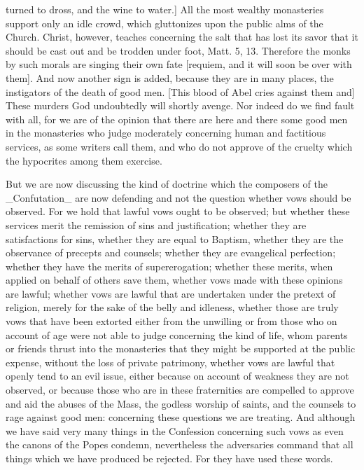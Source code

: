 turned to dross, and the wine to water.] All the most wealthy
monasteries support only an idle crowd, which gluttonizes upon the
public alms of the Church.  Christ, however, teaches concerning the
salt that has lost its savor that it should be cast out and be
trodden under foot, Matt. 5, 13. Therefore the monks by such morals
are singing their own fate [requiem, and it will soon be over with
them].  And now another sign is added, because they are in many
places, the instigators of the death of good men.  [This blood of
Abel cries against them and] These murders God undoubtedly will
shortly avenge.  Nor indeed do we find fault with all, for we are of
the opinion that there are here and there some good men in the
monasteries who judge moderately concerning human and factitious
services, as some writers call them, and who do not approve of the
cruelty which the hypocrites among them exercise.

But we are now discussing the kind of doctrine which the composers of
the _Confutation_ are now defending and not the question whether vows
should be observed.  For we hold that lawful vows ought to be
observed; but whether these services merit the remission of sins and
justification; whether they are satisfactions for sins, whether they
are equal to Baptism, whether they are the observance of precepts and
counsels; whether they are evangelical perfection; whether they have
the merits of supererogation; whether these merits, when applied on
behalf of others save them, whether vows made with these opinions are
lawful; whether vows are lawful that are undertaken under the pretext
of religion, merely for the sake of the belly and idleness, whether
those are truly vows that have been extorted either from the
unwilling or from those who on account of age were not able to judge
concerning the kind of life, whom parents or friends thrust into the
monasteries that they might be supported at the public expense,
without the loss of private patrimony, whether vows are lawful that
openly tend to an evil issue, either because on account of weakness
they are not observed, or because those who are in these fraternities
are compelled to approve and aid the abuses of the Mass, the godless
worship of saints, and the counsels to rage against good men:
concerning these questions we are treating.  And although we have
said very many things in the Confession concerning such vows as even
the canons of the Popes condemn, nevertheless the adversaries command
that all things which we have produced be rejected.  For they have
used these words.

